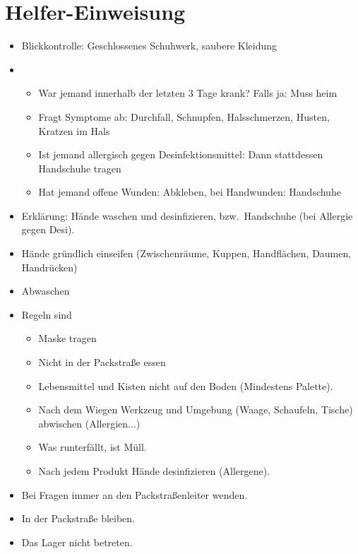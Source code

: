 \documentclass[a4paper]{scrartcl}
\begin{document}
\section*{Helfer-Einweisung}
\begin{itemize}
\item Blickkontrolle: Geschlossenes Schuhwerk, saubere Kleidung
\item
  \begin{itemize}
  \item War jemand innerhalb der letzten 3 Tage krank? Falls ja: Muss heim
  \item Fragt Symptome ab: Durchfall, Schnupfen, Halsschmerzen, Husten, Kratzen im Hals
  \item Ist jemand allergisch gegen Desinfektionsmittel: Dann stattdessen Handschuhe tragen
  \item Hat jemand offene Wunden: Abkleben, bei Handwunden: Handschuhe
  \end{itemize}
\item Erklärung: Hände waschen und desinfizieren, bzw.~Handschuhe (bei Allergie gegen Desi).
\item Hände gründlich einseifen (Zwischenräume, Kuppen, Handflächen, Daumen, Handrücken)
\item Abwaschen
\item Regeln sind
  \begin{itemize}
  \item Maske tragen
  \item Nicht in der Packstraße essen
  \item Lebensmittel und Kisten nicht auf den Boden (Mindestens Palette).
  \item Nach dem Wiegen Werkzeug und Umgebung (Waage, Schaufeln, Tische) abwischen (Allergien...)
  \item Was runterfällt, ist Müll.
  \item Nach jedem Produkt Hände desinfizieren (Allergene).
  \end{itemize}
\item Bei Fragen immer an den Packstraßenleiter wenden.
\item In der Packstraße bleiben.
\item Das Lager nicht betreten.
\end{itemize}
\end{document}
